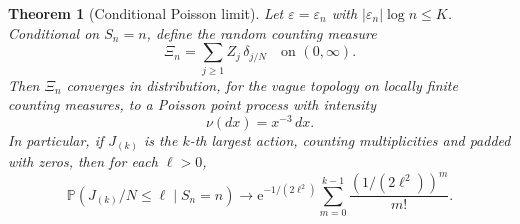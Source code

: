 \documentclass[11pt,a4paper]{article}
\numberwithin{equation}{section}
\newtheorem{theorem}{Theorem}[section]
\theoremstyle{definition}
\theoremstyle{remark}
\newcommand{\eps}{\varepsilon}
\newcommand{\Pp}{\mathbb P}
\newcommand{\ee}{\mathrm e}
\begin{document}
\begin{theorem}[Conditional Poisson limit]
\label{thm:PPP}
Let \(\eps=\eps_n\) with \(|\eps_n|\log n\le K\). Conditional on
\(S_n=n\), define the random counting measure
\begin{equation}
 \Xi_n=\sum_{j\ge1}Z_j\,\delta_{j/N}
 \quad\text{on }(0,\infty).
 \label{eq:point-process}
\end{equation}
Then \(\Xi_n\) converges in distribution, for the vague topology on locally
finite counting measures, to a Poisson point process with intensity
\begin{equation}
 \nu(dx)=x^{-3}\,dx.
 \label{eq:PPP-intensity}
\end{equation}
In particular, if \(J_{(k)}\) is the \(k\)-th largest action, counting
multiplicities and padded with zeros, then for each \(\ell>0\),
\begin{equation}
 \Pp(J_{(k)}/N\le\ell\mid S_n=n)
 \longrightarrow
 \ee^{-1/(2\ell^2)}
 \sum_{m=0}^{k-1}\frac{(1/(2\ell^2))^m}{m!}.
 \label{eq:kth-largest}
\end{equation}
\end{theorem}
\end{document}
